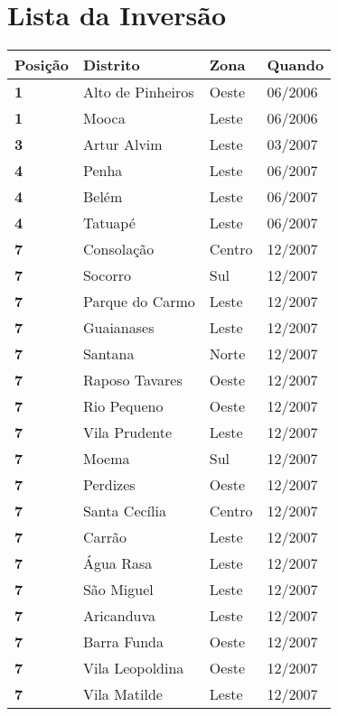 \section{Lista da Inversão}

\begin{table}[H]
\centering
\begin{tabular}{l|l|l|l}
\textbf{Posição} & \textbf{Distrito} & \textbf{Zona} & \textbf{Quando} \\ \hline
\textbf{1} & Alto de Pinheiros & Oeste & 06/2006\\ \hline
\textbf{1} & Mooca & Leste & 06/2006\\ \hline
\textbf{3} & Artur Alvim & Leste & 03/2007\\ \hline
\textbf{4} & Penha & Leste & 06/2007\\ \hline
\textbf{4} & Belém & Leste & 06/2007\\ \hline
\textbf{4} & Tatuapé & Leste & 06/2007\\ \hline
\textbf{7} & Consolação & Centro & 12/2007\\ \hline
\textbf{7} & Socorro & Sul & 12/2007\\ \hline
\textbf{7} & Parque do Carmo & Leste & 12/2007\\ \hline
\textbf{7} & Guaianases & Leste & 12/2007\\ \hline
\textbf{7} & Santana & Norte & 12/2007\\ \hline
\textbf{7} & Raposo Tavares & Oeste & 12/2007\\ \hline
\textbf{7} & Rio Pequeno & Oeste & 12/2007\\ \hline
\textbf{7} & Vila Prudente & Leste & 12/2007\\ \hline
\textbf{7} & Moema & Sul & 12/2007\\ \hline
\textbf{7} & Perdizes & Oeste & 12/2007\\ \hline
\textbf{7} & Santa Cecília & Centro & 12/2007\\ \hline
\textbf{7} & Carrão & Leste & 12/2007\\ \hline
\textbf{7} & Água Rasa & Leste & 12/2007\\ \hline
\textbf{7} & São Miguel & Leste & 12/2007\\ \hline
\textbf{7} & Aricanduva & Leste & 12/2007\\ \hline
\textbf{7} & Barra Funda & Oeste & 12/2007\\ \hline
\textbf{7} & Vila Leopoldina & Oeste & 12/2007\\ \hline
\textbf{7} & Vila Matilde & Leste & 12/2007\\ \hline

\end{tabular}
\end{table}
